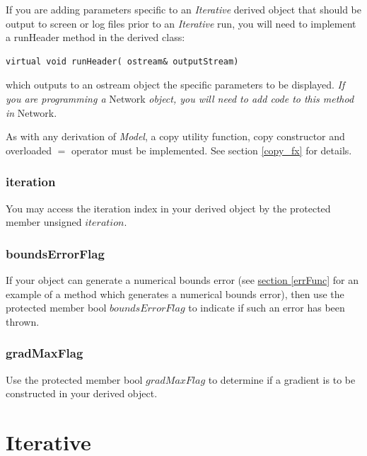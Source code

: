\documentclass{report}
\begin{document}
If you are adding parameters specific to an {\em Iterative} derived
object that should be output to screen or log files prior to an {\em
Iterative} run, you will need to implement a runHeader method in the
derived class:

\begin{verbatim}
virtual void runHeader( ostream& outputStream)
\end{verbatim}

which outputs to an ostream object the specific parameters to be
displayed.  {\em If you are programming a} Network {\em object, you
will need to add code to this method in} Network.

\hspace{10pt} \linebreak

As with any derivation of {\em Model}, a copy utility function, copy
constructor and overloaded $=$ operator must be implemented.  See
section \ref{copy_fx} for details.

\subsubsection{iteration}

You may access the iteration index in your derived object by the
protected member unsigned $iteration$.

\subsubsection{boundsErrorFlag}

If your object can generate a numerical bounds error (see
\hyperref[errFunc]{section \ref{errFunc}} for an example of a method
which generates a numerical bounds error), then use the protected
member bool $boundsErrorFlag$ to indicate if such an error has been
thrown.

\subsubsection{gradMaxFlag}

Use the protected member bool $gradMaxFlag$ to determine if a gradient
is to be constructed in your derived object.

\section{Iterative}
\end{document}
